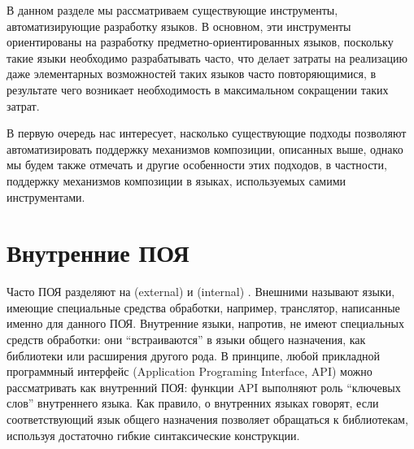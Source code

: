 В данном разделе мы рассматриваем существующие инструменты, автоматизирующие разработку языков. В основном, эти инструменты ориентированы на разработку предметно-ориентированных языков, поскольку такие языки необходимо разрабатывать часто, что делает затраты на реализацию даже элементарных возможностей таких языков часто повторяющимися, в результате чего возникает необходимость в максимальном сокращении таких затрат.

В первую очередь нас интересует, насколько существующие подходы позволяют автоматизировать поддержку механизмов композиции, описанных выше, однако мы будем также отмечать и другие особенности этих подходов, в частности, поддержку механизмов композиции в языках, используемых самими инструментами.

\section{Внутренние ПОЯ}

Часто ПОЯ разделяют на  (external) и  (internal) \cite{StateMachine}. Внешними называют языки, имеющие специальные средства обработки, например, транслятор, написанные именно для данного ПОЯ. Внутренние языки, напротив, не имеют специальных средств обработки: они ``встраиваются'' в языки общего назначения, как библиотеки или расширения другого рода. В принципе, любой прикладной программный интерфейс (Application Programing Interface, API) можно рассматривать как внутренний ПОЯ: функции API выполняют роль ``ключевых слов'' внутреннего языка. Как правило, о внутренних языках говорят, если соответствующий язык общего назначения позволяет обращаться к библиотекам, используя достаточно гибкие синтаксические конструкции.

